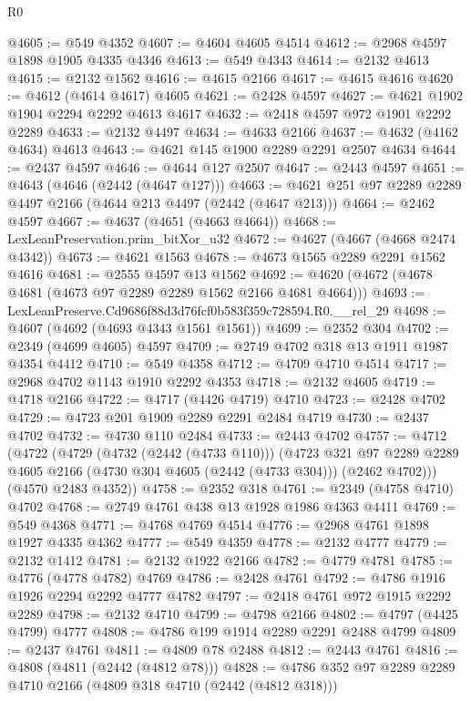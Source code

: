 \begin{lexlean}{R0}
\begin{coremodule}
@4605 := @549 @4352
@4607 := @4604 @4605 @4514
@4612 := @2968 @4597 @1898 @1905 @4335 @4346
@4613 := @549 @4343
@4614 := @2132 @4613
@4615 := @2132 @1562
@4616 := @4615 @2166
@4617 := @4615 @4616
@4620 := @4612 (@4614 @4617) @4605
@4621 := @2428 @4597
@4627 := @4621 @1902 @1904 @2294 @2292 @4613 @4617
@4632 := @2418 @4597 @972 @1901 @2292 @2289
@4633 := @2132 @4497
@4634 := @4633 @2166
@4637 := @4632 (@4162 @4634) @4613
@4643 := @4621 @145 @1900 @2289 @2291 @2507 @4634
@4644 := @2437 @4597
@4646 := @4644 @127 @2507
@4647 := @2443 @4597
@4651 := @4643 (@4646 (@2442 (@4647 @127)))
@4663 := @4621 @251 @97 @2289 @2289 @4497 @2166 (@4644 @213 @4497 (@2442 (@4647 @213)))
@4664 := @2462 @4597
@4667 := @4637 (@4651 (@4663 @4664))
@4668 := LexLeanPreservation.prim_bitXor_u32
@4672 := @4627 (@4667 (@4668 @2474 @4342))
@4673 := @4621 @1563
@4678 := @4673 @1565 @2289 @2291 @1562 @4616
@4681 := @2555 @4597 @13 @1562
@4692 := @4620 (@4672 (@4678 @4681 (@4673 @97 @2289 @2289 @1562 @2166 @4681 @4664)))
@4693 := LexLeanPreserve.Cd9686f88d3d76fcf0b583f359c728594.R0.__rel_29
@4698 := @4607 (@4692 (@4693 @4343 @1561 @1561))
@4699 := @2352 @304
@4702 := @2349 (@4699 @4605) @4597
@4709 := @2749 @4702 @318 @13 @1911 @1987 @4354 @4412
@4710 := @549 @4358
@4712 := @4709 @4710 @4514
@4717 := @2968 @4702 @1143 @1910 @2292 @4353
@4718 := @2132 @4605
@4719 := @4718 @2166
@4722 := @4717 (@4426 @4719) @4710
@4723 := @2428 @4702
@4729 := @4723 @201 @1909 @2289 @2291 @2484 @4719
@4730 := @2437 @4702
@4732 := @4730 @110 @2484
@4733 := @2443 @4702
@4757 := @4712
    (@4722
      (@4729
        (@4732 (@2442 (@4733 @110)))
        (@4723
          @321
          @97
          @2289
          @2289
          @4605
          @2166
          (@4730 @304 @4605 (@2442 (@4733 @304)))
          (@2462 @4702)))
      (@4570 @2483 @4352))
@4758 := @2352 @318
@4761 := @2349 (@4758 @4710) @4702
@4768 := @2749 @4761 @438 @13 @1928 @1986 @4363 @4411
@4769 := @549 @4368
@4771 := @4768 @4769 @4514
@4776 := @2968 @4761 @1898 @1927 @4335 @4362
@4777 := @549 @4359
@4778 := @2132 @4777
@4779 := @2132 @1412
@4781 := @2132 @1922 @2166
@4782 := @4779 @4781
@4785 := @4776 (@4778 @4782) @4769
@4786 := @2428 @4761
@4792 := @4786 @1916 @1926 @2294 @2292 @4777 @4782
@4797 := @2418 @4761 @972 @1915 @2292 @2289
@4798 := @2132 @4710
@4799 := @4798 @2166
@4802 := @4797 (@4425 @4799) @4777
@4808 := @4786 @199 @1914 @2289 @2291 @2488 @4799
@4809 := @2437 @4761
@4811 := @4809 @78 @2488
@4812 := @2443 @4761
@4816 := @4808 (@4811 (@2442 (@4812 @78)))
@4828 := @4786 @352 @97 @2289 @2289 @4710 @2166 (@4809 @318 @4710 (@2442 (@4812 @318)))

\end{coremodule}
\end{lexlean}

